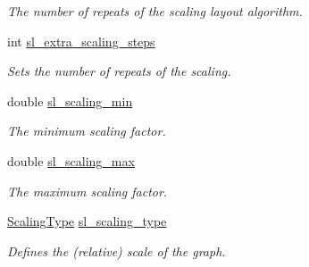 \begin{DoxyCompactItemize}
\begin{DoxyCompactList}\small\item\em The number of repeats of the scaling layout algorithm. \end{DoxyCompactList}\item 
\mbox{\label{structtmap_1_1LayoutConfiguration_aefd713cfba563ea8ee9a432c0359c440}} 
int \hyperlink{structtmap_1_1LayoutConfiguration_aefd713cfba563ea8ee9a432c0359c440}{sl\+\_\+extra\+\_\+scaling\+\_\+steps}
\begin{DoxyCompactList}\small\item\em Sets the number of repeats of the scaling. \end{DoxyCompactList}\item 
\mbox{\label{structtmap_1_1LayoutConfiguration_af2e01075c5fe2a36c6018b40a6919d7a}} 
double \hyperlink{structtmap_1_1LayoutConfiguration_af2e01075c5fe2a36c6018b40a6919d7a}{sl\+\_\+scaling\+\_\+min}
\begin{DoxyCompactList}\small\item\em The minimum scaling factor. \end{DoxyCompactList}\item 
\mbox{\label{structtmap_1_1LayoutConfiguration_aa29669e99b7e1df2bcb95d6379da7cc3}} 
double \hyperlink{structtmap_1_1LayoutConfiguration_aa29669e99b7e1df2bcb95d6379da7cc3}{sl\+\_\+scaling\+\_\+max}
\begin{DoxyCompactList}\small\item\em The maximum scaling factor. \end{DoxyCompactList}\item 
\mbox{\label{structtmap_1_1LayoutConfiguration_a618d286e035eca76e0e464513624beec}} 
\hyperlink{layout_8hh_a50ec215c9e54cf12b9dd0a0056160761}{Scaling\+Type} \hyperlink{structtmap_1_1LayoutConfiguration_a618d286e035eca76e0e464513624beec}{sl\+\_\+scaling\+\_\+type}
\begin{DoxyCompactList}\small\item\em Defines the (relative) scale of the graph. \end{DoxyCompactList}\item 
\mbox{\label{structtmap_1_1LayoutConfiguration_aff2347eb71c98bbc72f16b4de32d4af0}} 

\end{DoxyCompactItemize}
